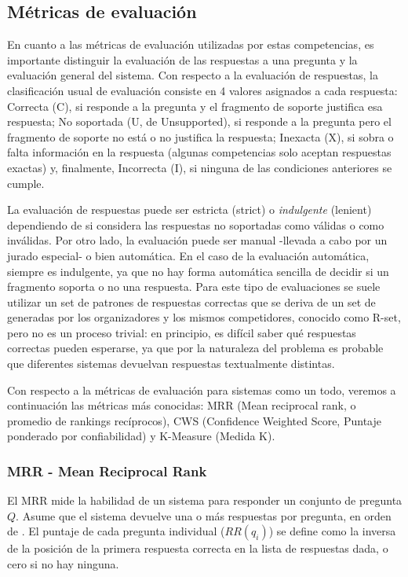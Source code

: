 \subsection{Métricas de evaluación}
\label{subsec:metricas}

En cuanto a las métricas de evaluación utilizadas por estas competencias, es importante distinguir la evaluación de las respuestas a una pregunta y la evaluación general del sistema. Con respecto a la evaluación de respuestas, la clasificación usual de evaluación consiste en 4 valores asignados a cada respuesta: Correcta (C), si responde a la pregunta y el fragmento de soporte justifica esa respuesta; No soportada (U, de Unsupported), si responde a la pregunta pero el fragmento de soporte no está o no justifica la respuesta; Inexacta (X), si sobra o falta información en la respuesta (algunas competencias solo aceptan respuestas exactas) y, finalmente, Incorrecta (I), si ninguna de las condiciones anteriores se cumple.

La evaluación de respuestas puede ser estricta (strict) o \textit{indulgente} (lenient) dependiendo de si considera las respuestas no soportadas como válidas o como inválidas. Por otro lado, la evaluación puede ser manual -llevada a cabo por un jurado especial- o bien automática. En el caso de la evaluación automática, siempre es indulgente, ya que no hay forma automática sencilla de decidir si un fragmento soporta o no una respuesta. Para este tipo de evaluaciones se suele utilizar un set de patrones de respuestas correctas que se deriva de un set de  generadas por los organizadores y los mismos competidores, conocido como R-set, pero no es un proceso trivial: en principio, es difícil saber qué respuestas correctas pueden esperarse, ya que por la naturaleza del problema es probable que diferentes sistemas devuelvan respuestas textualmente distintas.

Con respecto a la métricas de evaluación para sistemas como un todo, veremos a continuación las métricas más conocidas: MRR (Mean reciprocal rank, o promedio de rankings recíprocos), CWS (Confidence Weighted Score, Puntaje ponderado por confiabilidad) y K-Measure (Medida K).

\subsubsection*{MRR - Mean Reciprocal Rank}
El MRR mide la habilidad de un sistema para responder un conjunto de pregunta $Q$. Asume que el sistema devuelve una o más respuestas por pregunta, en orden de . El puntaje de cada pregunta individual ($RR(q_i)$) se define como la inversa de la posición de la primera respuesta correcta en la lista de respuestas dada, o cero si no hay ninguna.

